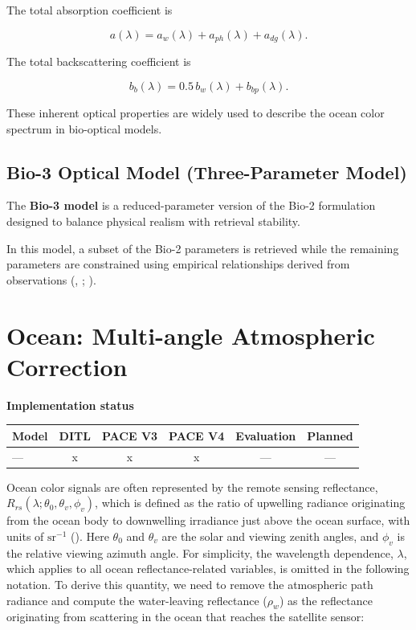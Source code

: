 \documentclass[
  11pt,
  letterpaper,
]{scrreprt}
\begin{document}
The total absorption coefficient is

\[
a(\lambda) =
a_w(\lambda) + a_{ph}(\lambda) + a_{dg}(\lambda).
\]

The total backscattering coefficient is

\[
b_b(\lambda) =
0.5\,b_w(\lambda) + b_{bp}(\lambda).
\]

These inherent optical properties are widely used to describe the ocean
color spectrum in bio-optical models.

\section{Bio-3 Optical Model (Three-Parameter
Model)}\label{bio-3-optical-model-three-parameter-model}

The \textbf{Bio-3 model} is a reduced-parameter version of the Bio-2
formulation designed to balance physical realism with retrieval
stability.

In this model, a subset of the Bio-2 parameters is retrieved while the
remaining parameters are constrained using empirical relationships
derived from observations (, ;
).

\chapter{Ocean: Multi-angle Atmospheric Correction}\label{sec-ocean-ac}

\textbf{Implementation status}

\begin{longtable}[]{@{}lccccc@{}}
\toprule\noalign{}
Model & DITL & PACE V3 & PACE V4 & Evaluation & Planned \\
\midrule\noalign{}
\endhead
\bottomrule\noalign{}
\endlastfoot
--- & x & x & x & --- & --- \\
\end{longtable}

Ocean color signals are often represented by the remote sensing
reflectance, \(R_{rs}(\lambda;\theta_0, \theta_v, \phi_v)\), which is
defined as the ratio of upwelling radiance originating from the ocean
body to downwelling irradiance just above the ocean surface, with units
of \(\mathrm{sr}^{-1}\) (). Here \(\theta_0\) and \(\theta_v\) are the solar and viewing
zenith angles, and \(\phi_v\) is the relative viewing azimuth angle. For
simplicity, the wavelength dependence, \(\lambda\), which applies to all
ocean reflectance-related variables, is omitted in the following
notation. To derive this quantity, we need to remove the atmospheric
path radiance and compute the water-leaving reflectance (\(\rho_w\)) as
the reflectance originating from scattering in the ocean that reaches
the satellite sensor:
\end{document}

